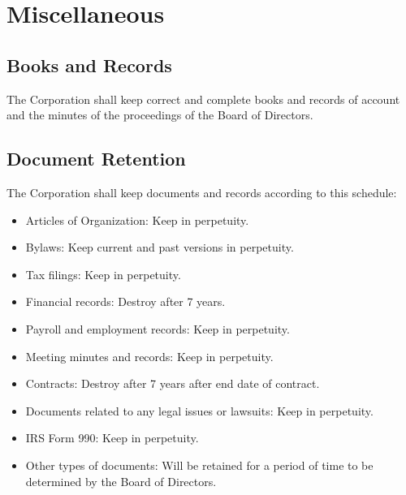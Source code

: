 \chapter{Miscellaneous}

\section{Books and Records}

The Corporation shall keep correct and complete books and records of account
and the minutes of the proceedings of the Board of Directors.

\section{Document Retention}

The Corporation shall keep documents and records according to this schedule:

\begin{itemize}

    \item Articles of Organization: Keep in perpetuity. 

    \item Bylaws: Keep current and past versions in perpetuity.  

    \item Tax filings: Keep in perpetuity.

    \item Financial records: Destroy after 7 years. 

    \item Payroll and employment records: Keep in perpetuity. 

    \item Meeting minutes and records: Keep in perpetuity. 

    \item Contracts: Destroy after 7 years after end date of contract. 

    \item Documents related to any legal issues or lawsuits: Keep in perpetuity. 

    \item IRS Form 990: Keep in perpetuity.

    \item Other types of documents: Will be retained for a period of time to be
        determined by the Board of Directors.

\end{itemize}

